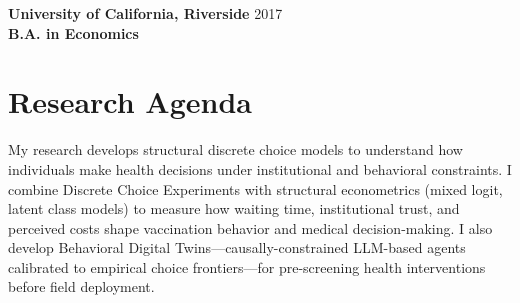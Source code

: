 \documentclass[11pt, letterpaper]{article}
\begin{document}
\vspace{0.5em}
\noindent \textbf{University of California, Riverside} \hfill 2017 \\
\textbf{B.A. in Economics}

\section*{Research Agenda}
My research develops structural discrete choice models to understand how individuals make health decisions under institutional and behavioral constraints. I combine Discrete Choice Experiments with structural econometrics (mixed logit, latent class models) to measure how waiting time, institutional trust, and perceived costs shape vaccination behavior and medical decision-making. I also develop Behavioral Digital Twins---causally-constrained LLM-based agents calibrated to empirical choice frontiers---for pre-screening health interventions before field deployment.
\end{document}
